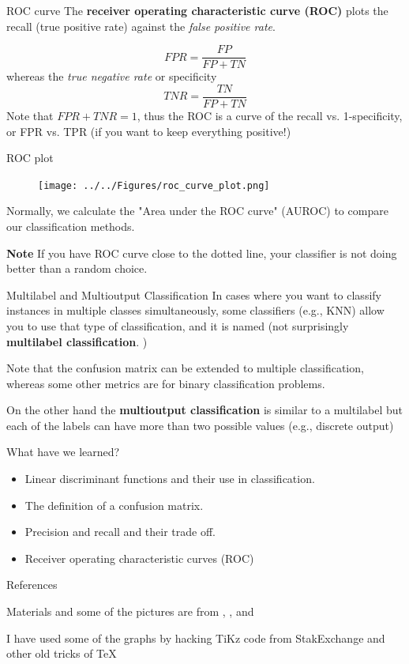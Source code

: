 \documentclass{beamer}
\begin{document}
\begin{frame}{ROC curve}
	The {\bf receiver operating characteristic curve (ROC)} plots the recall (true positive rate) against the {\it false positive rate}. 
	
	\begin{equation*}
		FPR= \frac{FP}{FP+TN}
	\end{equation*}
whereas the {\it true negative rate} or specificity 
\begin{equation*}
	TNR= \frac{TN}{FP+TN}
\end{equation*}
	Note that $FPR+TNR=1$, thus the ROC is a curve of the recall vs. 1-specificity, or FPR vs. TPR (if you want to keep everything positive!)
\end{frame}
\begin{frame}{ROC plot}
\begin{figure}
	\centering
	\texttt{[image: ../../Figures/roc\_curve\_plot.png]}
\end{figure}
Normally, we calculate the "Area under the ROC curve" (AUROC) to compare our classification methods.

{\bf Note} If you have ROC curve close to the dotted line, your classifier is not doing better than a random choice.
\end{frame}
\begin{frame}{Multilabel and Multioutput Classification}
	In cases where you want to classify instances in multiple classes simultaneously, some classifiers (e.g., KNN) allow you to use that type of classification, and it is named (not surprisingly {\bf multilabel classification}. )
	
	Note that the confusion matrix can be extended to multiple classification, whereas some other metrics are for binary classification problems.
	
	On the other hand the {\bf multioutput classification} is similar to a multilabel but each of the labels can have more than two possible values (e.g., discrete output)
\end{frame}

\begin{frame}{What have we learned?}
	\begin{itemize}
		\item Linear discriminant functions and their use in classification.
		\item The definition of a confusion matrix.
		\item Precision and recall and their trade off. 
		\item Receiver operating characteristic curves (ROC)

		
	\end{itemize}
\end{frame}


\begin{frame}{References}
	

Materials and some of the pictures are from \citep{James2015}, \citep{duda}, and \citep{geron2}
\printbibliography 

	
	I have used some of the graphs by hacking TiKz code from StakExchange and other old tricks of \TeX
\end{frame}		
\end{document}
